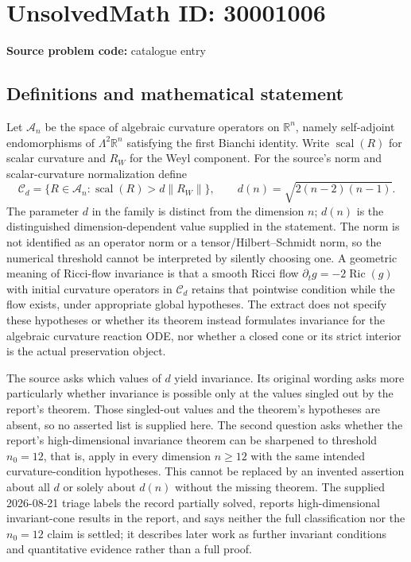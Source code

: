 \documentclass[11pt]{article}
\newcommand{\R}{\mathbb{R}}
\begin{document}
\section*{UnsolvedMath ID: 30001006}
\textbf{Source problem code:} catalogue entry
\subsection{Definitions and mathematical statement}
Let $\mathcal A_n$ be the space of algebraic curvature operators on $\R^n$, namely self-adjoint endomorphisms of $\Lambda^2\R^n$ satisfying the first Bianchi identity. Write $\operatorname{scal}(R)$ for scalar curvature and $R_W$ for the Weyl component. For the source's norm and scalar-curvature normalization define \[\mathcal C_d=\{R\in\mathcal A_n:\operatorname{scal}(R)>d\|R_W\|\},\qquad d(n)=\sqrt{2(n-2)(n-1)}.\] The parameter $d$ in the family is distinct from the dimension $n$; $d(n)$ is the distinguished dimension-dependent value supplied in the statement. The norm is not identified as an operator norm or a tensor/Hilbert--Schmidt norm, so the numerical threshold cannot be interpreted by silently choosing one. A geometric meaning of Ricci-flow invariance is that a smooth Ricci flow $\partial_tg=-2\operatorname{Ric}(g)$ with initial curvature operators in $\mathcal C_d$ retains that pointwise condition while the flow exists, under appropriate global hypotheses. The extract does not specify these hypotheses or whether its theorem instead formulates invariance for the algebraic curvature reaction ODE, nor whether a closed cone or its strict interior is the actual preservation object.\par The source asks which values of $d$ yield invariance. Its original wording asks more particularly whether invariance is possible only at the values singled out by the report's theorem. Those singled-out values and the theorem's hypotheses are absent, so no asserted list is supplied here. The second question asks whether the report's high-dimensional invariance theorem can be sharpened to threshold $n_0=12$, that is, apply in every dimension $n\geq12$ with the same intended curvature-condition hypotheses. This cannot be replaced by an invented assertion about all $d$ or solely about $d(n)$ without the missing theorem. The supplied 2026-08-21 triage labels the record partially solved, reports high-dimensional invariant-cone results in the report, and says neither the full classification nor the $n_0=12$ claim is settled; it describes later work as further invariant conditions and quantitative evidence rather than a full proof.
\end{document}

